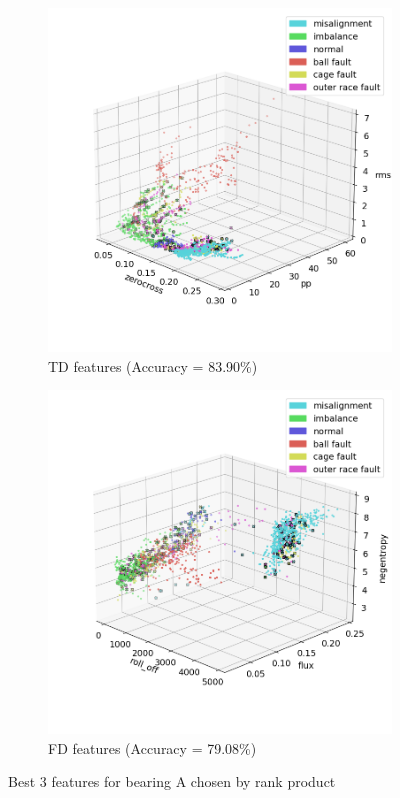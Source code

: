 \documentclass{llncs}
\begin{document}
\begin{figure}
	\centering
     \begin{subfigure}[b]{0.45\textwidth}
         \centering
         \includegraphics[width=\textwidth]{fig/scatter-mafaulda/td-rank-features.png}
         \caption{TD features (Accuracy = 83.90\%)}
     \end{subfigure}
     \hfill
     \begin{subfigure}[b]{0.45\textwidth}
         \centering
         \includegraphics[width=\textwidth]{fig/scatter-mafaulda/fd-rank-features.png}
         \caption{FD features (Accuracy = 79.08\%)}
     \end{subfigure}
     \hfill
     \caption{Best 3 features for bearing A chosen by rank product}
     \label{tab:scatter-rank-product}
\end{figure}
\end{document}
